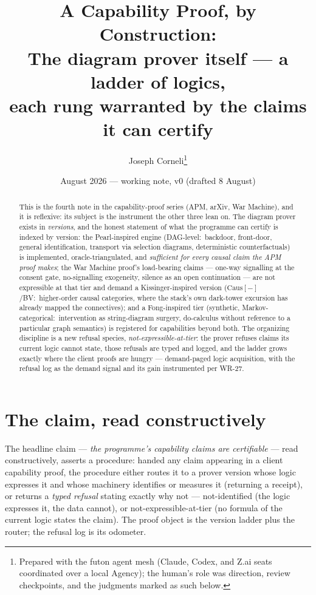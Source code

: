 \documentclass[11pt]{article}
\title{A Capability Proof, by Construction:\\
\large The diagram prover itself --- a ladder of logics,\\
each rung warranted by the claims it can certify}
\author{Joseph Corneli\thanks{Prepared with the futon agent mesh
(Claude, Codex, and Z.ai seats coordinated over a local Agency); the
human's role was direction, review checkpoints, and the judgments
marked as such below.}}
\date{August 2026 --- working note, v0 (drafted 8 August)}
\newcommand{\Caus}{\mathrm{Caus}}
\begin{document}
\maketitle

\begin{abstract}\noindent
This is the fourth note in the capability-proof series (APM, arXiv,
War Machine), and it is reflexive: its subject is the instrument the
other three lean on. The diagram prover exists in \emph{versions},
and the honest statement of what the programme can certify is
indexed by version: the Pearl-inspired engine (DAG-level:\ backdoor,
front-door, general identification, transport via selection
diagrams, deterministic counterfactuals) is implemented,
oracle-triangulated, and \emph{sufficient for every causal claim the
APM proof makes}; the War Machine proof's load-bearing claims ---
one-way signalling at the consent gate, no-signalling exogeneity,
silence as an open continuation --- are not expressible at that
tier and demand a Kissinger-inspired version
($\Caus[-]$/BV:\ higher-order causal categories, where the stack's
own dark-tower excursion has already mapped the connectives); and a
Fong-inspired tier (synthetic, Markov-categorical:\ intervention as
string-diagram surgery, do-calculus without reference to a
particular graph semantics) is registered for capabilities beyond
both. The organizing discipline is a new refusal species,
\emph{not-expressible-at-tier}: the prover refuses claims its
current logic cannot state, those refusals are typed and logged, and
the ladder grows exactly where the client proofs are hungry ---
demand-paged logic acquisition, with the refusal log as the demand
signal and its gain instrumented per WR-27.
\end{abstract}

\section{The claim, read constructively}

The headline claim --- \emph{the programme's capability claims are
certifiable} --- read constructively, asserts a procedure: handed
any claim appearing in a client capability proof, the procedure
either routes it to a prover version whose logic expresses it and
whose machinery identifies or measures it (returning a receipt), or
returns a \emph{typed refusal} stating exactly why not ---
not-identified (the logic expresses it, the data cannot), or
not-expressible-at-tier (no formula of the current logic states the
claim). The proof object is the version ladder plus the router;
the refusal log is its odometer.
\end{document}
